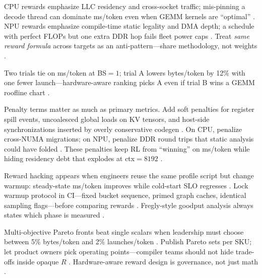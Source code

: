 CPU rewards emphasize LLC residency and cross-socket traffic; mis-pinning a decode thread can dominate ms/token even when GEMM kernels are ``optimal'' \citep{dlbook,chen2020compilerbasedhardw}. NPU rewards emphasize compile-time static legality and DMA depth; a schedule with perfect FLOPs but one extra DDR hop fails fleet power caps \citep{amd2024xdna,amd2024aie}. Treat \emph{same reward formula} across targets as an anti-pattern---share methodology, not weights \citep{yirage2026,amd2024aie,dlbook}.

\begin{example}
Two trials tie on ms/token at BS${=}1$; trial A lowers bytes/token by 12\% with one fewer launch---hardware-aware ranking picks A even if trial B wins a GEMM roofline chart \citep{memoryfloor2026,taxbreak2026,patel2025llminference}.
\end{example}

Penalty terms matter as much as primary metrics. Add soft penalties for register spill events, uncoalesced global loads on KV tensors, and host-side synchronizations inserted by overly conservative codegen \citep{semianalysis2024tma,nvidia2022hopper,patel2025llminference}. On CPU, penalize cross-NUMA migrations; on NPU, penalize DDR round trips that static analysis could have folded \citep{dlbook,amd2024xdna,amd2024aie,chen2020compilerbasedhardw}. These penalties keep RL from ``winning'' on ms/token while hiding residency debt that explodes at ctx${=}8192$ \citep{memoryfloor2026,dao2022flashattention,kwon2023vllm,yirage2026}.

Reward hacking appears when engineers reuse the same profile script but change warmup: steady-state ms/token improves while cold-start SLO regresses \citep{memoryfloor2026,nvidia2024cudagraphs,patel2025llminference}. Lock warmup protocol in CI---fixed bucket sequence, primed graph caches, identical sampling flags---before comparing rewards \citep{kwon2023vllm,taxbreak2026,yirage2026,chen2020compilerbasedhardw,dlbook,liu2024deepseekv3,amd2024aie,semianalysis2024tma,dao2022flashattention,dao2023flashdecoding,nvidia2022hopper}. Fregly-style goodput analysis always states which phase is measured \citep{patel2025llminference,dlbook,memoryfloor2026}.

Multi-objective Pareto fronts beat single scalars when leadership must choose between 5\% bytes/token and 2\% launches/token \citep{taxbreak2026,memoryfloor2026,semianalysis2024tma}. Publish Pareto sets per SKU; let product owners pick operating points---compiler teams should not hide trade-offs inside opaque $R$ \citep{patel2025llminference,chen2020compilerbasedhardw,yirage2026,amd2024xdna,amd2024aie,dlbook,kwon2023vllm,liu2024deepseekv3,dao2022flashattention,dao2023flashdecoding,nvidia2024cudagraphs,nvidia2022hopper}. Hardware-aware reward design is governance, not just math \citep{yirage2026,chen2020compilerbasedhardw,memoryfloor2026,taxbreak2026,patel2025llminference,amd2024aie,semianalysis2024tma,dlbook}.


